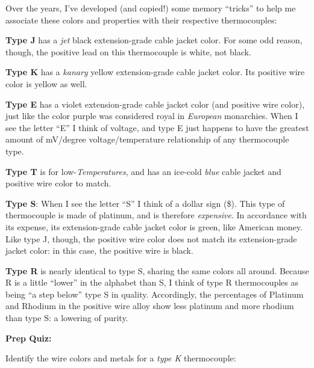 \begin{itemize}
\begin{itemize}
\begin{itemize}
\begin{itemize}
\begin{itemize}
\begin{itemize}
\begin{itemize}
\begin{itemize}
\begin{itemize}
\begin{itemize}
\begin{itemize}
\begin{itemize}
Over the years, I've developed (and copied!) some memory ``tricks'' to help me associate these colors and properties with their respective thermocouples:

\vskip 10pt

{\bf Type J} has a {\it jet} black extension-grade cable jacket color.  For some odd reason, though, the positive lead on this thermocouple is white, not black.

\vskip 10pt

{\bf Type K} has a {\it kanary} yellow extension-grade cable jacket color.  Its positive wire color is yellow as well.

\vskip 10pt

{\bf Type E} has a violet extension-grade cable jacket color (and positive wire color), just like the color purple was considered royal in {\it European} monarchies.  When I see the letter ``E'' I think of voltage, and type E just happens to have the greatest amount of mV/degree voltage/temperature relationship of any thermocouple type.

\vskip 10pt

{\bf Type T} is for low-{\it Temperatures}, and has an ice-cold {\it blue} cable jacket and positive wire color to match.

\vskip 10pt

{\bf Type S}: When I see the letter ``S'' I think of a dollar sign (\$).  This type of thermocouple is made of platinum, and is therefore {\it expensive}.  In accordance with its expense, its extension-grade cable jacket color is green, like American money.  Like type J, though, the positive wire color does not match its extension-grade jacket color: in this case, the positive wire is black.

\vskip 10pt

{\bf Type R} is nearly identical to type S, sharing the same colors all around.  Because R is a little ``lower'' in the alphabet than S, I think of type R thermocouples as being ``a step below'' type S in quality.  Accordingly, the percentages of Platinum and Rhodium in the positive wire alloy show less platinum and more rhodium than type S: a lowering of purity. 

\vfil \eject

\noindent
{\bf Prep Quiz:}

Identify the wire colors and metals for a {\it type K} thermocouple:


\end{itemize}
\end{itemize}
\end{itemize}
\end{itemize}
\end{itemize}
\end{itemize}
\end{itemize}
\end{itemize}
\end{itemize}
\end{itemize}
\end{itemize}
\end{itemize}
